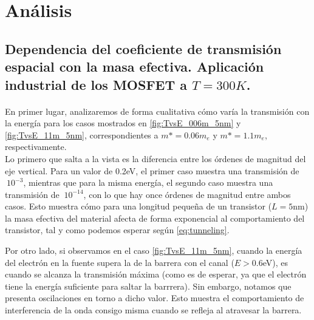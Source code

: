 
\section{Análisis}

\subsection{Dependencia del coeficiente de transmisión espacial con la masa efectiva. Aplicación industrial de los MOSFET a $T=300K$.}
\paragraph{} En primer lugar, analizaremos de forma cualitativa cómo varía la transmisión con la energía para los casos mostrados en \ref{fig:TvsE_006m_5nm} y \ref{fig:TvsE_11m_5nm}, correspondientes a \textbf{$m* = 0.06 m_e$} y \textbf{$m* = 1.1 m_e$}, respectivamente. \\ 
Lo primero que salta a la vista es la diferencia entre los órdenes de magnitud del eje vertical. Para un valor de 0.2eV, el primer caso muestra una transmisión de $~10^{-3}$, mientras que para la misma energía, el segundo caso muestra una transmisión de $~10^{-14}$, con lo que hay once órdenes de magnitud entre ambos casos. Esto muestra cómo para una longitud pequeña de un transistor ($L=5$nm) la masa efectiva del material afecta de forma exponencial al comportamiento del transistor, tal y como podemos esperar según \ref{eq:tunneling}. 

Por otro lado, si observamos en el caso \ref{fig:TvsE_11m_5nm}, cuando la energía del  electrón en la fuente supera la de la barrera con el canal ($E>0.6$eV), es cuando se alcanza la transmisión máxima (como es de esperar, ya que el electrón tiene la energía suficiente para saltar la barrrera). Sin embargo, notamos que presenta oscilaciones en torno a dicho valor. Esto muestra el comportamiento de interferencia de la onda consigo misma cuando se refleja al atravesar la barrera. 

